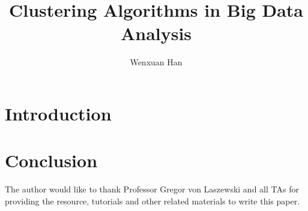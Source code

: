\documentclass[sigconf]{acmart}
\begin{document}
\title{Clustering Algorithms in Big Data Analysis}


\author{Wenxuan Han}




\begin{abstract}

\end{abstract}



\maketitle



\section{Introduction}


\section{Conclusion}


\begin{acks}

The author would like to thank Professor Gregor von Laszewski and all TAs for providing the resource, tutorials and other related materials to write this paper.

\end{acks}




% 
\end{document}
